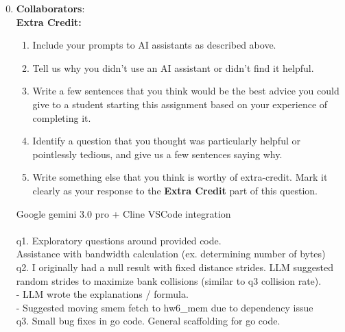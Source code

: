 \documentclass{article}
\newenvironment{answer}
{\par\color{blue}}
{\normalfont\par}
\begin{document}
\begin{enumerate}\setcounter{enumi}{-1}
    \item \textbf{Collaborators}:\\
          \textbf{Extra Credit:}
          \begin{enumerate}
              \item Include your prompts to AI assistants as described above.
              \item Tell us why you didn't use an AI assistant or didn't find it helpful.
              \item Write a few sentences that you think would be the best advice you could
                    give to a student starting this assignment based on your experience of
                    completing it.
              \item Identify a question that you thought was particularly helpful or
                    pointlessly tedious, and give us a few sentences saying why.
              \item Write something else that you think is worthy of extra-credit.
                    Mark it clearly as your response to the \textbf{Extra Credit} part
                    of this question.
          \end{enumerate}

          \begin{answer}
              Google gemini 3.0 pro + Cline VSCode integration \\ \\

              q1. Exploratory questions around provided code. \\
              Assistance with bandwidth calculation (ex. determining number of bytes) \\
              q2. I originally had a null result with fixed distance strides. LLM suggested random strides to maximize bank collisions (similar to q3 collision rate). \\
              - LLM wrote the explanations / formula. \\
              - Suggested moving smem fetch to hw6\_mem due to dependency issue \\
              q3. Small bug fixes in go code. General scaffolding for go code. \\

          \end{answer}


\end{enumerate}
\end{document}

